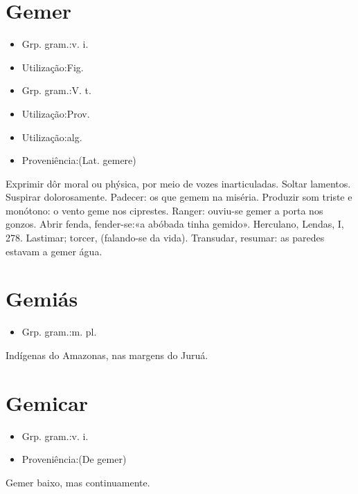 \section{Gemer}
\begin{itemize}
\item {Grp. gram.:v. i.}
\end{itemize}
\begin{itemize}
\item {Utilização:Fig.}
\end{itemize}
\begin{itemize}
\item {Grp. gram.:V. t.}
\end{itemize}
\begin{itemize}
\item {Utilização:Prov.}
\end{itemize}
\begin{itemize}
\item {Utilização:alg.}
\end{itemize}
\begin{itemize}
\item {Proveniência:(Lat. \textunderscore gemere\textunderscore )}
\end{itemize}
Exprimir dôr moral ou phýsica, por meio de vozes inarticuladas.
Soltar lamentos.
Suspirar dolorosamente.
Padecer: \textunderscore os que gemem na miséria\textunderscore .
Produzir som triste e monótono: \textunderscore o vento geme nos ciprestes\textunderscore .
Ranger: \textunderscore ouviu-se gemer a porta nos gonzos\textunderscore .
Abrir fenda, fender-se:«\textunderscore a abóbada tinha gemido\textunderscore ». Herculano, \textunderscore Lendas\textunderscore , I, 278.
Lastimar; torcer, (falando-se da vida).
Transudar, resumar: \textunderscore as paredes estavam a gemer água\textunderscore .
\section{Gemiás}
\begin{itemize}
\item {Grp. gram.:m. pl.}
\end{itemize}
Indígenas do Amazonas, nas margens do Juruá.
\section{Gemicar}
\begin{itemize}
\item {Grp. gram.:v. i.}
\end{itemize}
\begin{itemize}
\item {Proveniência:(De \textunderscore gemer\textunderscore )}
\end{itemize}
Gemer baixo, mas continuamente.
